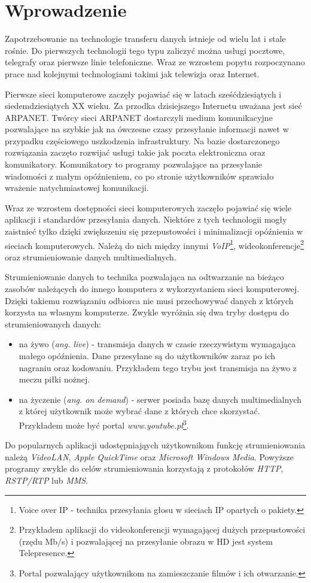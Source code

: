 \chapter{Wprowadzenie}
\label{cha:rozdzial1}

Zapotrzebowanie na technologie transferu danych istnieje od wielu lat i stale rośnie. Do pierwszych technologii tego typu zaliczyć można usługi pocztowe, telegrafy oraz pierwsze linie telefoniczne. Wraz ze wzrostem popytu rozpoczynano prace nad kolejnymi technologiami takimi jak telewizja oraz Internet.

Pierwsze sieci komputerowe zaczęły pojawiać się w latach sześćdziesiątych i siedemdziesiątych XX wieku. Za przodka dzisiejszego Internetu uważana jest sieć ARPANET. Twórcy sieci ARPANET dostarczyli medium komunikacyjne pozwalające na szybkie jak na ówczesne czasy przesyłanie informacji nawet w przypadku częściowego uszkodzenia infrastruktury. Na bazie dostarczonego rozwiązania zaczęto rozwijać usługi takie jak poczta elektroniczna oraz komunikatory. Komunikatory to programy pozwalające na przesyłanie wiadomości z małym opóźnieniem, co po stronie użytkowników sprawiało wrażenie natychmiastowej komunikacji.

Wraz ze wzrostem dostępności sieci komputerowych zaczęło pojawiać się wiele aplikacji i standardów przesyłania danych. Niektóre z tych technologii mogły zaistnieć tylko dzięki zwiększeniu się przepustowości i minimalizacji opóźnienia w sieciach komputerowych. Należą do nich między innymi \textit{VoIP}\footnote{Voice over IP - technika przesyłania głosu w sieciach IP opartych o pakiety.}, wideokonferencje\footnote{Przykładem aplikacji do videokonferencji wymagającej dużych przepustowości (rzędu Mb/s) i pozwalającej na przesyłanie obrazu w HD jest system Telepresence.} oraz strumieniowanie danych multimedialnych.

Strumieniowanie danych to technika pozwalająca na odtwarzanie na bieżąco zasobów należących do innego komputera z wykorzystaniem sieci komputerowej. Dzięki takiemu rozwiązaniu odbiorca nie musi przechowywać danych z których korzysta na własnym komputerze. Zwykle wyróżnia się dwa tryby dostępu do strumieniowanych danych:
\begin{itemize}
\item na żywo (\textit{ang. live}) - transmisja danych w czasie rzeczywistym wymagająca małego opóźnienia. Dane przesyłane są do użytkowników zaraz po ich nagraniu oraz kodowaniu. Przykładem tego trybu jest transmisja na żywo z meczu piłki nożnej.
\item na życzenie (\textit{ang. on demand}) - serwer posiada bazę danych multimedialnych z której użytkownik może wybrać dane z których chce skorzystać. Przykładem może być portal \textit{www.youtube.pl}\footnote{Portal pozwalający użytkownikom na zamieszczanie filmów i ich otwarzanie.}.
\end{itemize}
Do popularnych aplikacji udostępniająych użytkownikom funkcję strumieniowania należą \textit{VideoLAN}, \textit{Apple QuickTime} oraz \textit{Microsoft Windows Media}. Powyższe programy zwykle do celów strumieniowania korzystają z protokołów \textit{HTTP}, \textit{RSTP/RTP} lub \textit{MMS}.

